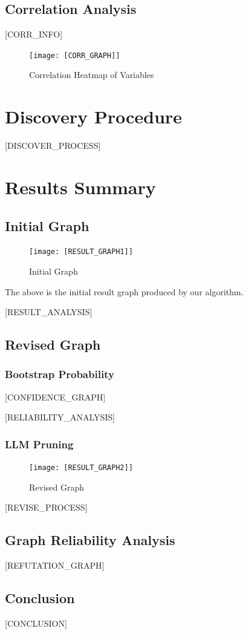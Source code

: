 \documentclass{article}
\begin{document}
\subsection{Correlation Analysis}

\begin{minipage}[t]{0.5\linewidth}
    [CORR_INFO]
\vfill
\end{minipage}
\hfill
\begin{minipage}[t]{0.5\linewidth}
    \begin{figure}[H]
        \centering
        \vspace{-1.5cm}
        \texttt{[image: [CORR\_GRAPH]]}
        \caption{\label{fig:corr}Correlation Heatmap of Variables}
    \end{figure}
\end{minipage}

\section{Discovery Procedure}
[DISCOVER_PROCESS]

\section{Results Summary}

\subsection{Initial Graph}

\begin{figure}[H]
    \centering
    \texttt{[image: [RESULT\_GRAPH1]]}
    \caption{Initial Graph}
\end{figure}

The above is the initial result graph produced by our algorithm.

[RESULT_ANALYSIS]

\clearpage

\subsection{Revised Graph}

\subsubsection{Bootstrap Probability}
[CONFIDENCE_GRAPH]

[RELIABILITY_ANALYSIS]

\subsubsection{LLM Pruning}

\begin{figure}[H]
    \centering
    \texttt{[image: [RESULT\_GRAPH2]]}
    \caption{Revised Graph}
\end{figure}

[REVISE_PROCESS]


\subsection{Graph Reliability Analysis}

[REFUTATION_GRAPH]

\subsection{Conclusion}
[CONCLUSION]
\end{document}
